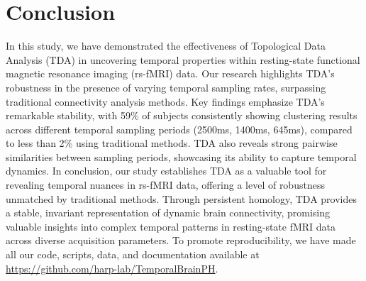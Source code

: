 \section{Conclusion}
\label{sec:conclusion}

In this study, we have demonstrated the effectiveness of Topological Data Analysis (TDA) in uncovering temporal properties within resting-state functional magnetic resonance imaging (rs-fMRI) data. Our research highlights TDA's robustness in the presence of varying temporal sampling rates, surpassing traditional connectivity analysis methods. Key findings emphasize TDA's remarkable stability, with 59\% of subjects consistently showing clustering results across different temporal sampling periods (2500ms, 1400ms, 645ms), compared to less than 2\% using traditional methods. TDA also reveals strong pairwise similarities between sampling periods, showcasing its ability to capture temporal dynamics. In conclusion, our study establishes TDA as a valuable tool for revealing temporal nuances in rs-fMRI data, offering a level of robustness unmatched by traditional methods. Through persistent homology, TDA provides a stable, invariant representation of dynamic brain connectivity, promising valuable insights into complex temporal patterns in resting-state fMRI data across diverse acquisition parameters. To promote reproducibility, we have made all our code, scripts, data, and documentation available at \url{https://github.com/harp-lab/TemporalBrainPH}.